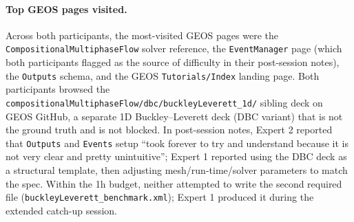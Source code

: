 \documentclass{article}
\begin{document}
\begin{table}[h]
  \caption{Browser-navigation breakdown during the one-hour authoring session, per participant. ``GEOS docs'' = visits to the GEOS Sphinx documentation host (\texttt{geosx-geosx.readthedocs-hosted.com}) including all subpages. ``GEOS GitHub'' = visits to \texttt{github.com/GEOS-DEV/GEOS}. ``Other'' = unrelated tabs that remained open during the session. No participant visited any LLM chatbot, Stack Overflow, or general scientific-paper site.}
  \label{tab:human-browser}
  \centering
  \small
\end{table}

\paragraph{Top GEOS pages visited.} Across both participants, the most-visited GEOS pages were the \texttt{CompositionalMultiphaseFlow} solver reference, the \texttt{EventManager} page (which both participants flagged as the source of difficulty in their post-session notes), the \texttt{Outputs} schema, and the GEOS \texttt{Tutorials/Index} landing page. Both participants browsed the \texttt{compositionalMultiphaseFlow/dbc/buckleyLeverett\_1d/} sibling deck on GEOS GitHub, a separate 1D Buckley--Leverett deck (DBC variant) that is not the ground truth and is not blocked. In post-session notes, Expert 2 reported that \texttt{Outputs} and \texttt{Events} setup ``took forever to try and understand because it is not very clear and pretty unintuitive''; Expert 1 reported using the DBC deck as a structural template, then adjusting mesh/run-time/solver parameters to match the spec. Within the 1h budget, neither attempted to write the second required file (\texttt{buckleyLeverett\_benchmark.xml}); Expert 1 produced it during the extended catch-up session.
\end{document}
